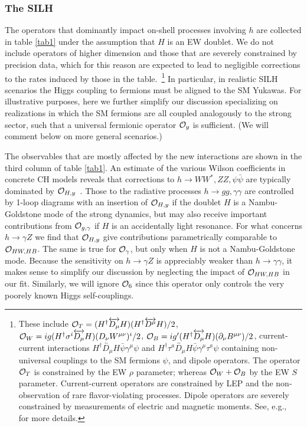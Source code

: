 




\subsubsection{The SILH}

The operators that dominantly impact on-shell processes involving $h$ are collected in table \ref{tab1} under the assumption that $H$ is an EW doublet. We do not include operators of higher dimension and those that are severely constrained by precision data, which for this reason are expected to lead to negligible corrections to the rates induced by those in the table.~\footnote{These include ${\cal O}_T=(H^\dagger\overleftrightarrow{D_\mu}H)(H^\dagger\overleftrightarrow{D^\mu}H)/2$, ${\cal O}_W={i}g(H^\dagger\sigma^i\overleftrightarrow{D_\mu} H)(D_\nu W^{\mu\nu})^i/2$, ${\cal O}_B=ig'(H^\dagger\overleftrightarrow{D_\mu} H)(\partial_\nu B^{\mu\nu})/2$, current-current interactions $H^\dagger \overleftrightarrow{D_\mu}H \bar \psi\gamma^\mu \psi$ and $H^\dagger \tau^a\overleftrightarrow{D_\mu}H \bar \psi\gamma^\mu \tau^a\psi$ containing non-universal couplings to the SM fermions $\psi$, and dipole operators. The operator ${\cal O}_T$ is constrained by the EW $\rho$ parameter; whereas ${\cal O}_W+{\cal O}_B$ by the EW $S$ parameter. Current-current operators are constrained by LEP and the non-observation of rare flavor-violating processes. Dipole operators are severely constrained by measurements of electric and magnetic moments. See, e.g.,~\cite{Contino:2013kra} for more details.%
} In particular, in realistic SILH scenarios the Higgs coupling to fermions must be aligned to the SM Yukawas. For illustrative purposes, here we further simplify our discussion specializing on realizations in which the SM fermions are all coupled analogously to the strong sector, such that a universal fermionic operator ${\cal O}_y$ is sufficient. (We will comment below on more general scenarios.)

The observables that are mostly affected by the new interactions are shown in the third column of table \ref{tab1}. An estimate of the various Wilson coefficients in concrete CH models reveals that corrections to $h\to WW^*,ZZ,\psi\bar\psi$ are typically dominated by ${\cal O}_{H,y}$~\cite{Giudice:2007fh}. Those to the radiative processes $h\to gg,\gamma\gamma$ are controlled by 1-loop diagrams with an insertion of ${\cal O}_{H,y}$ if the doublet $H$ is a Nambu-Goldstone mode of the strong dynamics, but may also receive important contributions from ${\cal O}_{g,\gamma}$ if $H$ is an accidentally light resonance. For what concerns $h\to\gamma Z$ we find that ${\cal O}_{H,y}$ give contributions parametrically comparable to ${\cal O}_{HW, HB}$. The same is true for ${\cal O}_{\gamma}$, but only when $H$ is not a Nambu-Goldstone mode. Because the sensitivity on $h\to\gamma Z$ is appreciably weaker than $h\to\gamma\gamma$, it makes sense to simplify our discussion by neglecting the impact of ${\cal O}_{HW, HB}$ in our fit. Similarly, we will ignore ${\cal O}_6$ since this operator only controls the very poorely known Higgs self-couplings.


